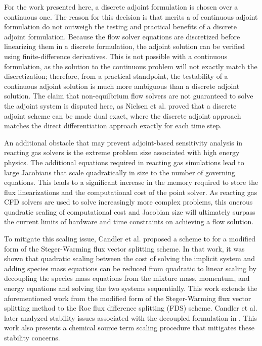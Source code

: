 For the work presented here, a discrete adjoint formulation is chosen over a
continuous one.  The reason for this decision is that merits a of continuous
adjoint formulation do not outweigh the testing and practical benefits of a
discrete adjoint formulation.  Because the flow solver equations are discretized
before linearizing them in a discrete formulation, the adjoint solution can be
verified using finite-difference derivatives.  This is not possible with a
continuous formulation, as the solution to the continuous problem will not
exactly match the discretization; therefore, from a practical standpoint, the
testability of a continuous adjoint solution is much more ambiguous than a
discrete adjoint solution.  The claim that non-equilbrium flow solvers are not
guaranteed to solve the adjoint system is disputed here, as Nielsen et
al.\cite{nielsen2004implicit} proved that a discrete adjoint scheme can be made
dual exact, where the discrete adjoint approach matches the direct
differentiation approach exactly for each time step.

An additional obstacle that may prevent adjoint-based sensitivity analysis in
reacting gas solvers is the extreme problem size associated with high energy
physics.  The additional equations required in reacting gas simulations lead to
large Jacobians that scale quadratically in size to the number of governing
equations.  This leads to a significant increase in the memory required to store
the flux linearizations and the computational cost of the point solver.  As
reacting gas CFD solvers are used to solve increasingly more complex problems,
this onerous quadratic scaling of computational cost and Jacobian size will
ultimately surpass the current limits of hardware and time constraints on
achieving a flow solution\cite{fischer}.

To mitigate this scaling issue, Candler et al.\cite{candler} proposed a scheme
to for a modified form of the Steger-Warming flux vector splitting
scheme\cite{MacCormack,Steger}. In that work, it was shown that quadratic
scaling between the cost of solving the implicit system and adding species mass
equations can be reduced from quadratic to linear scaling by decoupling the
species mass equations from the mixture mass, momentum, and energy equations and
solving the two systems sequentially.  This work extends the aforementioned work
from the modified form of the Steger-Warming flux vector splitting
method to the Roe flux difference splitting (FDS) scheme.  Candler et
al.\cite{candler2013analysis} later analyzed stability issues associated with
the decoupled formulation in \cite{candler}.  This work also presents a chemical
source term scaling procedure that mitigates these stability concerns.

